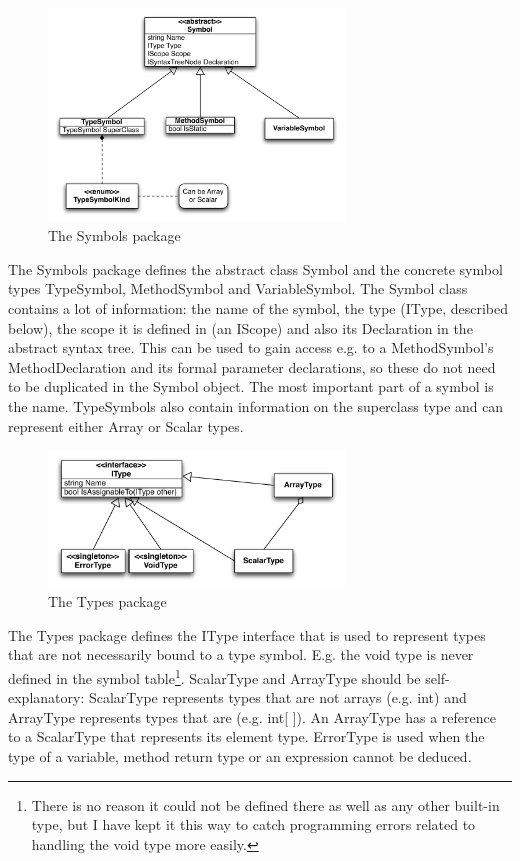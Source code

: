 \documentclass[a4paper,11pt]{article}
\begin{document}
\begin{figure}[h!]
\centering
\includegraphics[width=0.7\textwidth]{symbols.pdf}
\caption{The Symbols package}
\end{figure}

The Symbols package defines the abstract class Symbol and the concrete symbol types TypeSymbol, MethodSymbol and VariableSymbol. The Symbol class contains a lot of information: the name of the symbol, the type (IType, described below), the scope it is defined in (an IScope) and also its Declaration in the abstract syntax tree. This can be used to gain access e.g. to a MethodSymbol's MethodDeclaration and its formal parameter declarations, so these do not need to be duplicated in the Symbol object. The most important part of a symbol is the name. TypeSymbols also contain information on the superclass type and can represent either Array or Scalar types.

\begin{figure}[h!]
\centering
\includegraphics[width=0.7\textwidth]{types.pdf}
\caption{The Types package}
\end{figure}

The Types package defines the IType interface that is used to represent types that are not necessarily bound to a type symbol. E.g. the void type is never defined in the symbol table\footnote{There is no reason it could not be defined there as well as any other built-in type, but I have kept it this way to catch programming errors related to handling the void type more easily.}. ScalarType and ArrayType should be self-explanatory: ScalarType represents types that are not arrays (e.g. int) and ArrayType represents types that are (e.g. int[ ]). An ArrayType has a reference to a ScalarType that represents its element type. ErrorType is used when the type of a variable, method return type or an expression cannot be deduced.
\end{document}
